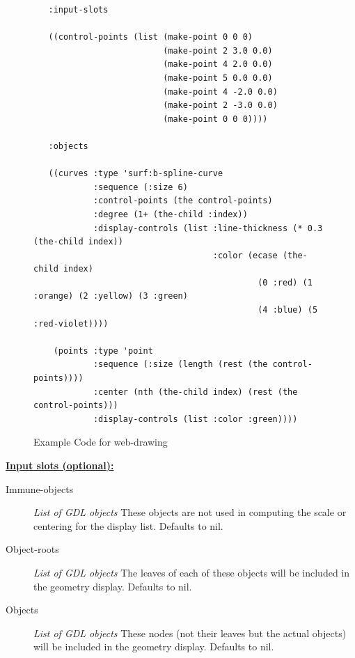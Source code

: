 \documentclass [11pt]{book}
\begin{document}
\begin{itemize}
\begin{figure}
\begin{lrbox}{\boxedverb}
\begin{minipage}{\linewidth}
{\begin{verbatim}
   :input-slots

   ((control-points (list (make-point 0 0 0)
                          (make-point 2 3.0 0.0) 
                          (make-point 4 2.0 0.0) 
                          (make-point 5 0.0 0.0) 
                          (make-point 4 -2.0 0.0) 
                          (make-point 2 -3.0 0.0) 
                          (make-point 0 0 0))))
  
   :objects

   ((curves :type 'surf:b-spline-curve
            :sequence (:size 6)
            :control-points (the control-points)
            :degree (1+ (the-child :index))
            :display-controls (list :line-thickness (* 0.3 (the-child index))
                                    :color (ecase (the-child index)
                                             (0 :red) (1 :orange) (2 :yellow) (3 :green)
                                             (4 :blue) (5 :red-violet))))

    (points :type 'point 
            :sequence (:size (length (rest (the control-points))))
            :center (nth (the-child index) (rest (the control-points)))
            :display-controls (list :color :green))))

\end{verbatim}}
\end{minipage}
\end{lrbox}
\fbox{\usebox{\boxedverb}}

\caption{Example Code for web-drawing}

\label{fig:example-code-web-drawing}

\end{figure}





\textbf{
\underline{Input slots (optional):}}

\begin{description}

\item [Immune-objects]
\emph{List of GDL objects} These objects are not used in computing the scale or centering for the display list. Defaults to nil.


\item [Object-roots]
\emph{List of GDL objects} The leaves of each of these objects will be included in the geometry display. Defaults to nil.


\item [Objects]
\emph{List of GDL objects} These nodes (not their leaves but the actual objects) will be included in the geometry display. Defaults to nil.



\end{description}
\end{itemize}
\end{document}

